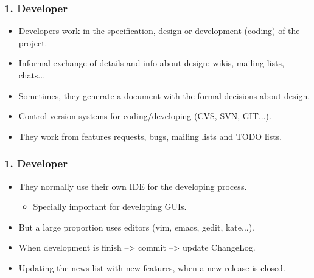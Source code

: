 \documentclass{beamer}
\begin{document}

\begin{frame}
 \frametitle{1. Developer}
 \begin{itemize}
  \item Developers work in the specification, design or development 
  (coding) of the project.
  \item Informal exchange of details and info about design: wikis, mailing lists, chats...
  \item Sometimes, they generate a document with the formal decisions about design.
  \item Control version systems for coding/developing (CVS, SVN, GIT...).
  \item They work from features requests, bugs, mailing lists and TODO lists.
 \end{itemize}

\end{frame}


\begin{frame}
 \frametitle{1. Developer}
 \begin{itemize}
  \item They normally use their own IDE for the developing process.
  \begin{itemize}
   \item Specially important for developing GUIs.
  \end{itemize}
  \item But a large proportion uses editors (vim, emacs, gedit, kate...).
  \item When development is finish --> commit --> update ChangeLog.
  \item Updating the news list with new features, when a new release is closed.
 \end{itemize}

\end{frame}

\end{document}
